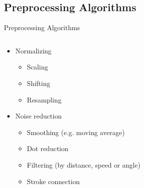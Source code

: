 \subsection{Preprocessing Algorithms}
\begin{frame}{Preprocessing Algorithms}
    \begin{columns}[T] %
    \begin{column}[T]{5cm} %
        \begin{itemize}
            \item<1-> Normalizing
            \begin{itemize}
                \item<2-> Scaling
                \item<2-> Shifting
                \item<3-> Resampling
            \end{itemize}
            \item<1-> Noise reduction
            \begin{itemize}
                \item<4-> Smoothing (e.g. moving average)
                \item<5-> Dot reduction
                \item<6-> Filtering (by distance, speed or angle)
                \item<8-> Stroke connection
            \end{itemize}
        \end{itemize}
    \end{column}
    \begin{column}[T]{6cm} %

\end{column}
\end{columns}
\end{frame}
